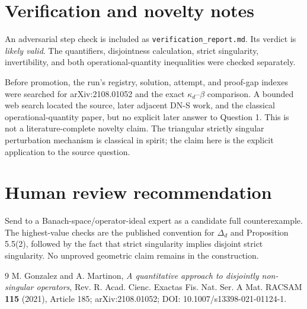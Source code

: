 \documentclass[11pt]{article}
\begin{document}
\section*{Verification and novelty notes}

An adversarial step check is included as
\texttt{verification\_report.md}.  Its verdict is \emph{likely valid}.  The
quantifiers, disjointness calculation, strict singularity, invertibility,
and both operational-quantity inequalities were checked separately.

Before promotion, the run's registry, solution, attempt, and proof-gap
indexes were searched for arXiv:2108.01052 and the exact
$\kappa_d$--$\beta$ comparison.  A bounded web search located the source,
later adjacent DN-S work, and the classical operational-quantity paper, but
no explicit later answer to Question 1.  This is not a literature-complete
novelty claim.  The triangular strictly singular perturbation mechanism is
classical in spirit; the claim here is the explicit application to the
source question.

\section*{Human review recommendation}

Send to a Banach-space/operator-ideal expert as a candidate full
counterexample.  The highest-value checks are the published convention for
$\Delta_d$ and Proposition 5.5(2), followed by the fact that strict
singularity implies disjoint strict singularity.  No unproved geometric
claim remains in the construction.

\begin{thebibliography}{9}
M. Gonzalez and A. Martinon,
\emph{A quantitative approach to disjointly non-singular operators},
Rev. R. Acad. Cienc. Exactas Fis. Nat. Ser. A Mat. RACSAM
\textbf{115} (2021), Article 185;
arXiv:2108.01052; DOI: 10.1007/s13398-021-01124-1.
\end{thebibliography}
\end{document}
